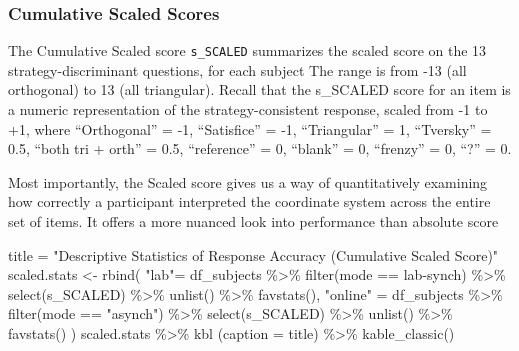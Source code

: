 \documentclass[
  letterpaper,
  DIV=11,
  numbers=noendperiod]{scrreprt}
\newenvironment{Shaded}{\begin{snugshade}}{\end{snugshade}}
\newcommand{\AttributeTok}[1]{\textcolor[rgb]{0.40,0.45,0.13}{#1}}
\newcommand{\FunctionTok}[1]{\textcolor[rgb]{0.28,0.35,0.67}{#1}}
\newcommand{\NormalTok}[1]{\textcolor[rgb]{0.00,0.23,0.31}{#1}}
\newcommand{\OtherTok}[1]{\textcolor[rgb]{0.00,0.23,0.31}{#1}}
\newcommand{\SpecialCharTok}[1]{\textcolor[rgb]{0.37,0.37,0.37}{#1}}
\newcommand{\StringTok}[1]{\textcolor[rgb]{0.13,0.47,0.30}{#1}}
\begin{document}
\hypertarget{cumulative-scaled-scores}{%
\subsubsection{Cumulative Scaled
Scores}\label{cumulative-scaled-scores}}

The Cumulative Scaled score \texttt{s\_SCALED} summarizes the scaled
score on the 13 strategy-discriminant questions, for each subject The
range is from -13 (all orthogonal) to 13 (all triangular). Recall that
the s\_SCALED score for an item is a numeric representation of the
strategy-consistent response, scaled from -1 to +1, where ``Orthogonal''
= -1, ``Satisfice'' = -1, ``Triangular'' = 1, ``Tversky'' = 0.5, ``both
tri + orth'' = 0.5, ``reference'' = 0, ``blank'' = 0, ``frenzy'' = 0,
``?'' = 0.

Most importantly, the Scaled score gives us a way of quantitatively
examining how correctly a participant interpreted the coordinate system
across the entire set of items. It offers a more nuanced look into
performance than absolute score

\begin{Shaded}
\begin{Highlighting}[]
\NormalTok{title }\OtherTok{=} \StringTok{"Descriptive Statistics of Response Accuracy (Cumulative Scaled Score)"}
\NormalTok{scaled.stats }\OtherTok{\textless{}{-}} \FunctionTok{rbind}\NormalTok{(}
  \StringTok{"lab"}\OtherTok{=}\NormalTok{ df\_subjects }\SpecialCharTok{\%\textgreater{}\%} \FunctionTok{filter}\NormalTok{(mode }\SpecialCharTok{==} \StringTok{\textquotesingle{}lab{-}synch\textquotesingle{}}\NormalTok{) }\SpecialCharTok{\%\textgreater{}\%} \FunctionTok{select}\NormalTok{(s\_SCALED) }\SpecialCharTok{\%\textgreater{}\%} \FunctionTok{unlist}\NormalTok{() }\SpecialCharTok{\%\textgreater{}\%} \FunctionTok{favstats}\NormalTok{(),}
  \StringTok{"online"} \OtherTok{=}\NormalTok{ df\_subjects }\SpecialCharTok{\%\textgreater{}\%} \FunctionTok{filter}\NormalTok{(mode }\SpecialCharTok{==} \StringTok{"asynch"}\NormalTok{) }\SpecialCharTok{\%\textgreater{}\%} \FunctionTok{select}\NormalTok{(s\_SCALED) }\SpecialCharTok{\%\textgreater{}\%} \FunctionTok{unlist}\NormalTok{() }\SpecialCharTok{\%\textgreater{}\%} \FunctionTok{favstats}\NormalTok{()}
\NormalTok{) }
\NormalTok{scaled.stats }\SpecialCharTok{\%\textgreater{}\%} \FunctionTok{kbl}\NormalTok{ (}\AttributeTok{caption =}\NormalTok{ title) }\SpecialCharTok{\%\textgreater{}\%} \FunctionTok{kable\_classic}\NormalTok{()}
\end{Highlighting}
\end{Shaded}
\end{document}

